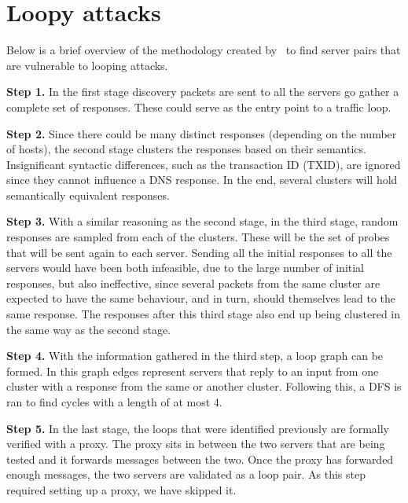 \section{Loopy attacks}
\label{appendix:loopy_attacks}
Below is a brief overview of the methodology created by~\cite{cispa-loopy} to find server pairs that are vulnerable to looping attacks. 

 \textbf{Step 1.} In the first stage discovery packets are sent to all the servers go gather a complete set of responses. These could serve as the entry point to a traffic loop.  

 \textbf{Step 2.} Since there could be many distinct responses (depending on the number of hosts), the second stage clusters the responses based on their semantics. Insignificant syntactic differences, such as the transaction ID (TXID), are ignored since they cannot influence a DNS response. In the end, several clusters will hold semantically equivalent responses. 

 \textbf{Step 3.} With a similar reasoning as the second stage, in the third stage, random responses are sampled from each of the clusters. These will be the set of probes that will be sent again to each server. Sending all the initial responses to all the servers would have been both infeasible, due to the large number of initial responses, but also ineffective, since several packets from the same cluster are expected to have the same behaviour, and in turn, should themselves lead to the same response. The responses after this third stage also end up being clustered in the same way as the second stage.  

 \textbf{Step 4.} With the information gathered in the third step, a loop graph can be formed. In this graph edges represent servers that reply to an input from one cluster with a response from the same or another cluster. Following this, a DFS is ran to find cycles with a length of at most 4.

  \textbf{Step 5.} In the last stage, the loops that were identified previously are formally verified with a proxy. The proxy sits in between the two servers that are being tested and it forwards messages between the two. Once the proxy has forwarded enough messages, the two servers are validated as a loop pair. As this step required setting up a proxy, we have skipped it.








